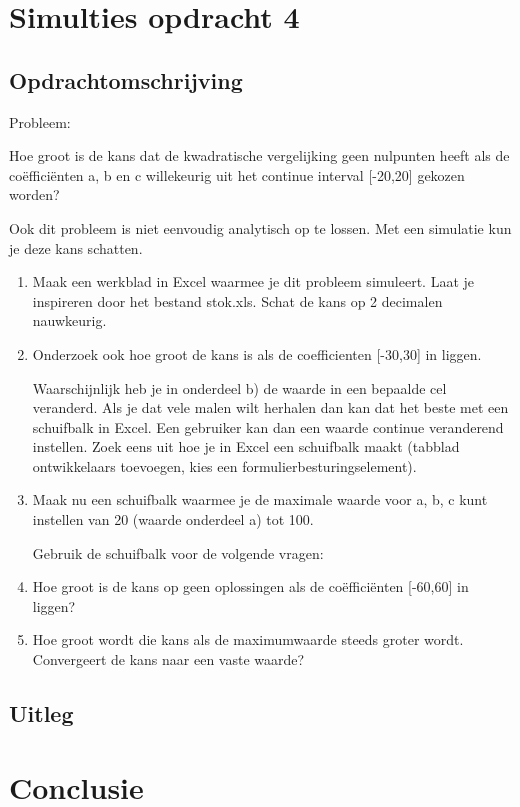 \documentclass{article}
\begin{document}



\section{Simulties opdracht 4}
\label{sec:sample_main}

\subsection{Opdrachtomschrijving}
\label{subsec:sample_opdrom}

Probleem:

Hoe groot is de kans dat de kwadratische vergelijking geen nulpunten heeft als de coëfficiënten a, b en c willekeurig uit het continue interval [-20,20] gekozen worden?

Ook dit probleem is niet eenvoudig analytisch op te lossen. Met een simulatie kun je deze kans schatten.


\begin{enumerate}[label=(\Alph*)]

\item Maak een werkblad in Excel waarmee je dit probleem simuleert. Laat je inspireren door het bestand stok.xls. Schat de kans op 2 decimalen nauwkeurig.

\item Onderzoek ook hoe groot de kans is als de coefficienten [-30,30] in liggen.

Waarschijnlijk heb je in onderdeel b) de waarde in een bepaalde cel veranderd. Als je dat vele malen wilt herhalen dan kan dat het beste met een schuifbalk in Excel. Een gebruiker kan dan een waarde continue veranderend instellen. Zoek eens uit hoe je in Excel een schuifbalk maakt (tabblad ontwikkelaars toevoegen, kies een formulierbesturingselement).

\item Maak nu een schuifbalk waarmee je de maximale waarde voor a, b, c kunt instellen van 20 (waarde onderdeel a) tot 100.

Gebruik de schuifbalk voor de volgende vragen:

\item Hoe groot is de kans op geen oplossingen als de coëfficiënten [-60,60] in liggen?

\item Hoe groot wordt die kans als de maximumwaarde steeds groter wordt. Convergeert de kans naar een vaste waarde?
\end{enumerate}


\newpage
\subsection{Uitleg}
\label{subsec:sample_uitv}

\section{Conclusie}
\label{subsec:sample_con}
\end{document}

